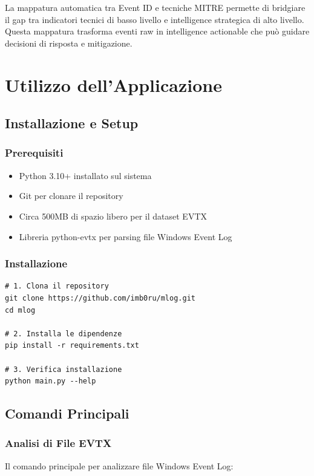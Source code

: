 \documentclass[12pt,a4paper]{report}
\theoremstyle{definition}
\begin{document}
La mappatura automatica tra Event ID e tecniche MITRE permette di bridgiare il gap tra indicatori tecnici di basso livello e intelligence strategica di alto livello. Questa mappatura trasforma eventi raw in intelligence actionable che può guidare decisioni di risposta e mitigazione.

\chapter{Utilizzo dell'Applicazione}

\section{Installazione e Setup}

\subsection{Prerequisiti}
\begin{itemize}
\item Python 3.10+ installato sul sistema
\item Git per clonare il repository
\item Circa 500MB di spazio libero per il dataset EVTX
\item Libreria python-evtx per parsing file Windows Event Log
\end{itemize}

\subsection{Installazione}
\begin{verbatim}
# 1. Clona il repository
git clone https://github.com/imb0ru/mlog.git
cd mlog

# 2. Installa le dipendenze
pip install -r requirements.txt

# 3. Verifica installazione
python main.py --help
\end{verbatim}

\section{Comandi Principali}

\subsection{Analisi di File EVTX}
Il comando principale per analizzare file Windows Event Log:
\end{document}
